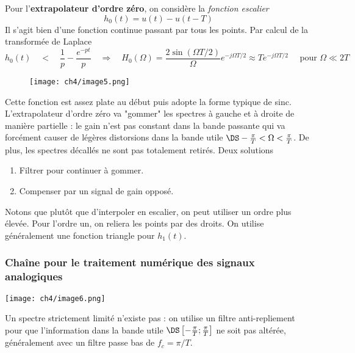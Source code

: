 		Pour l'\textbf{extrapolateur d'ordre zéro}, on considère la \textit{fonction escalier}
		\begin{equation}
		h_0(t) = u(t)-u(t-T)
		\end{equation}
		Il s'agit bien d'une fonction continue passant par tous les points. Par calcul de la 
		transformée de Laplace
		\begin{equation}
		h_0(t)\quad\lt\quad \frac{1}{p}-\frac{e^{-pt}}{p}\quad\Longrightarrow\quad
		H_0(\Omega) = \frac{2\sin(\Omega T/2)}{\Omega}e^{-j\Omega T/2}\approx Te^{-j\Omega T/2}\quad 
		\text{ pour }\Omega \ll 2T
		\end{equation}
		
			\begin{wrapfigure}[10]{l}{7cm}
	\texttt{[image: ch4/image5.png]}
	\end{wrapfigure}	
		Cette fonction est assez plate au début puis adopte la forme typique de sinc.
		L'extrapolateur d'ordre zéro va "gommer" les spectres à gauche et à droite de manière 
		partielle : le gain n'est pas constant dans la bande passante qui va forcément causer de 
		légères distorsions dans la bande utile $\DS -\frac{\pi}{T}<\Omega<\frac{\pi}{T}$. De plus, 
		les spectres décallés ne sont pas totalement retirés. Deux solutions 
		\begin{enumerate}
		\item Filtrer pour continuer à gommer.
		\item Compenser par un signal de gain opposé.
		\end{enumerate}
		
	Notons que plutôt que d'interpoler en escalier, on peut utiliser un ordre plus élevée. Pour 
	l'ordre un, on reliera les points par des droits. On utilise généralement une fonction 
	triangle pour $h_1(t)$.
	
	\subsubsection{Chaîne pour le traitement numérique des signaux analogiques}
	\begin{center}
		\texttt{[image: ch4/image6.png]}
	\end{center}
	Un spectre strictement limité n'existe pas : on utilise un filtre anti-repliement pour 
	que l'information dans la bande utile $\DS \left[-\frac{\pi}{T};\frac{\pi}{T}\right]$ ne 
	soit pas altérée, généralement avec un filtre passe bas de $f_c = \pi/T$.\\
	
